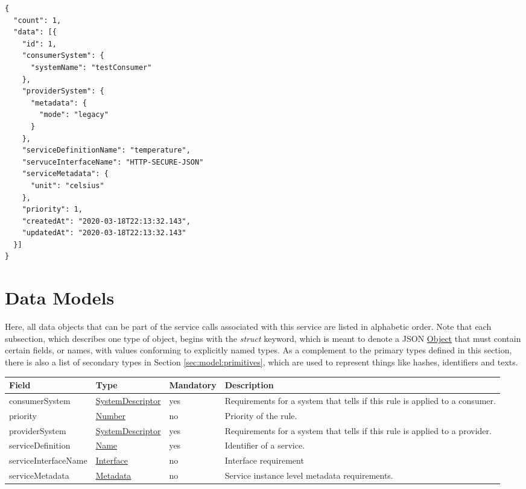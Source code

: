 \documentclass[a4paper]{arrowhead}
\newcommand{\fref}[1]{{\textcolor{ArrowheadBlue}{\hyperref[sec:functions:#1]{#1}}}}
\newcommand{\pref}[1]{{\textcolor{ArrowheadGrey}{\hyperref[sec:model:primitives:#1]{#1}}}}
\begin{document}
\begin{lstlisting}[language=http,label={lst:orchestration-create-flexible-store-rules_response},caption={An \fref{orchestration-create-flexible-store-rules} response.}]
{
  "count": 1,
  "data": [{
    "id": 1,
    "consumerSystem": {
      "systemName": "testConsumer"
    },
    "providerSystem": {
      "metadata": {
        "mode": "legacy"
      }
    },
    "serviceDefinitionName": "temperature",
    "servuceInterfaceName": "HTTP-SECURE-JSON"
    "serviceMetadata": {
      "unit": "celsius"
    },
    "priority": 1,
    "createdAt": "2020-03-18T22:13:32.143",
    "updatedAt": "2020-03-18T22:13:32.143"
  }]
}
\end{lstlisting}

\newpage

\section{Data Models}
\label{sec:model}

Here, all data objects that can be part of the service calls associated with this service are listed in alphabetic order.
Note that each subsection, which describes one type of object, begins with the \textit{struct} keyword, which is meant to denote a JSON \pref{Object} that must contain certain fields, or names, with values conforming to explicitly named types.
As a complement to the primary types defined in this section, there is also a list of secondary types in Section \ref{sec:model:primitives}, which are used to represent things like hashes, identifiers and texts.

\label{sec:model:FlexibleRule}
 
\begin{table}[ht!]
\begin{tabularx}{\textwidth}{| p{3.5cm} | p{3cm} | p{2cm} | X |} \hline
\rowcolor{gray!33} Field & Type & Mandatory & Description \\ \hline
consumerSystem & \hyperref[sec:model:SystemDescriptor]{SystemDescriptor} & yes & Requirements for a system that tells if this rule is applied to a consumer. \\ \hline
priority & \pref{Number} & no & Priority of the rule. \\ \hline
providerSystem & \hyperref[sec:model:SystemDescriptor]{SystemDescriptor} & yes & Requirements for a system that tells if this rule is applied to a provider. \\ \hline
serviceDefinition & \pref{Name} & yes & Identifier of a service. \\ \hline
serviceInterfaceName & \pref{Interface} & no & Interface requirement \\ \hline
serviceMetadata & \hyperref[sec:model:Metadata]{Metadata} & no & Service instance level metadata requirements. \\ \hline

\end{tabularx}
\end{table}
\end{document}
